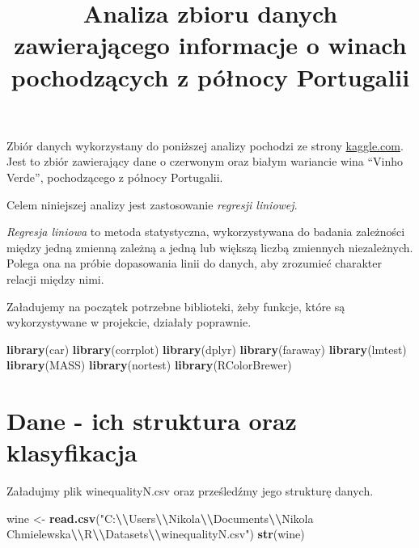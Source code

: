 \documentclass[
]{article}
\title{Analiza zbioru danych zawierającego informacje o winach
pochodzących z północy Portugalii}
\author{}
\date{\vspace{-2.5em}}
\newenvironment{Shaded}{\begin{snugshade}}{\end{snugshade}}
\newcommand{\FunctionTok}[1]{\textcolor[rgb]{0.13,0.29,0.53}{\textbf{#1}}}
\newcommand{\NormalTok}[1]{#1}
\newcommand{\OtherTok}[1]{\textcolor[rgb]{0.56,0.35,0.01}{#1}}
\newcommand{\SpecialCharTok}[1]{\textcolor[rgb]{0.81,0.36,0.00}{\textbf{#1}}}
\newcommand{\StringTok}[1]{\textcolor[rgb]{0.31,0.60,0.02}{#1}}
\begin{document}
\maketitle

Zbiór danych wykorzystany do poniższej analizy pochodzi ze strony
\href{https://www.kaggle.com/datasets/shelvigarg/wine-quality-dataset/data}{kaggle.com}.
Jest to zbiór zawierający dane o czerwonym oraz białym wariancie wina
``Vinho Verde'', pochodzącego z północy Portugalii.

Celem niniejszej analizy jest zastosowanie \emph{regresji liniowej}.

\emph{Regresja liniowa} to metoda statystyczna, wykorzystywana do
badania zależności między jedną zmienną zależną a jedną lub większą
liczbą zmiennych niezależnych. Polega ona na próbie dopasowania linii do
danych, aby zrozumieć charakter relacji między nimi.

Załadujemy na początek potrzebne biblioteki, żeby funkcje, które są
wykorzystywane w projekcie, działały poprawnie.

\begin{Shaded}
\begin{Highlighting}[]
\FunctionTok{library}\NormalTok{(car)}
\FunctionTok{library}\NormalTok{(corrplot)}
\FunctionTok{library}\NormalTok{(dplyr)}
\FunctionTok{library}\NormalTok{(faraway)}
\FunctionTok{library}\NormalTok{(lmtest)}
\FunctionTok{library}\NormalTok{(MASS)}
\FunctionTok{library}\NormalTok{(nortest)}
\FunctionTok{library}\NormalTok{(RColorBrewer)}
\end{Highlighting}
\end{Shaded}

\section{Dane - ich struktura oraz
klasyfikacja}\label{dane---ich-struktura-oraz-klasyfikacja}

Załadujmy plik winequalityN.csv oraz prześledźmy jego strukturę danych.

\begin{Shaded}
\begin{Highlighting}[]
\NormalTok{wine }\OtherTok{\textless{}{-}} \FunctionTok{read.csv}\NormalTok{(}\StringTok{"C:}\SpecialCharTok{\textbackslash{}\textbackslash{}}\StringTok{Users}\SpecialCharTok{\textbackslash{}\textbackslash{}}\StringTok{Nikola}\SpecialCharTok{\textbackslash{}\textbackslash{}}\StringTok{Documents}\SpecialCharTok{\textbackslash{}\textbackslash{}}\StringTok{Nikola Chmielewska}\SpecialCharTok{\textbackslash{}\textbackslash{}}\StringTok{R}\SpecialCharTok{\textbackslash{}\textbackslash{}}\StringTok{Datasets}\SpecialCharTok{\textbackslash{}\textbackslash{}}\StringTok{winequalityN.csv"}\NormalTok{)}
\FunctionTok{str}\NormalTok{(wine)}
\end{Highlighting}
\end{Shaded}
\end{document}
